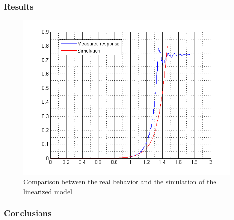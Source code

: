 \subsubsection{Results}
\begin{figure}[H] 
	\centering 
	\includegraphics[scale=0.9]{figures/comparisonRealModel}
	\caption{Comparison between the real behavior and the simulation of the linearized model}
	\label{comparisonRealModel}
\end{figure} 

\subsubsection{Conclusions}